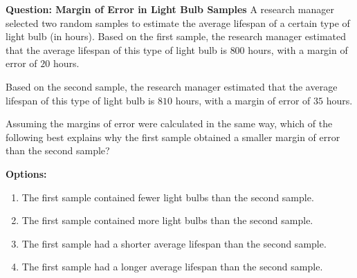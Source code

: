 \documentclass{beamer}
\begin{document}
\begin{frame}{\textbf{Question: Margin of Error in Light Bulb Samples}}
    \small  %
    A research manager selected two random samples to estimate the average lifespan of a certain type of light bulb (in hours). Based on the first sample, the research manager estimated that the average lifespan of this type of light bulb is \(800\) hours, with a margin of error of \(20\) hours. 

    \vspace{0.2cm}
    Based on the second sample, the research manager estimated that the average lifespan of this type of light bulb is \(810\) hours, with a margin of error of \(35\) hours. 

    \vspace{0.2cm}
    Assuming the margins of error were calculated in the same way, which of the following best explains why the first sample obtained a smaller margin of error than the second sample?

    \vspace{0.4cm}
    \textbf{Options:}
    \begin{enumerate}
        \item[A] The first sample contained fewer light bulbs than the second sample.
        \item[B] The first sample contained more light bulbs than the second sample.
        \item[C] The first sample had a shorter average lifespan than the second sample.
        \item[D] The first sample had a longer average lifespan than the second sample.
    \end{enumerate}
\end{frame}
\end{document}
